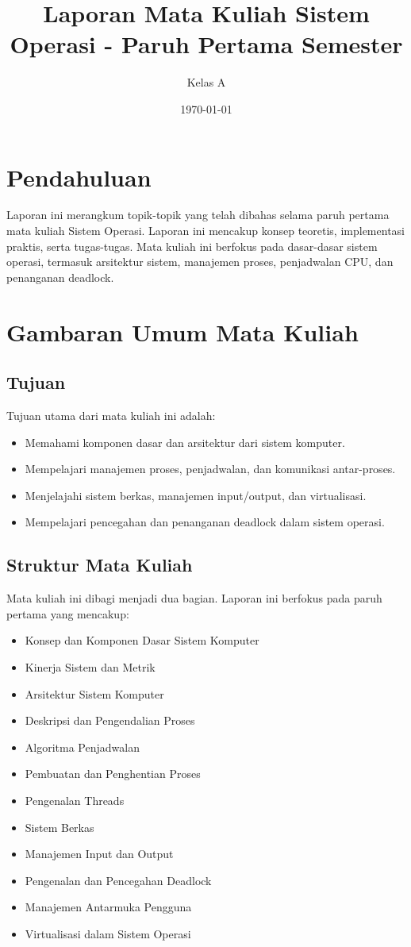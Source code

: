 \documentclass{article}
\title{Laporan Mata Kuliah Sistem Operasi - Paruh Pertama Semester}
\author{Kelas A}
\date{\today}
\begin{document}
\maketitle

\section{Pendahuluan}
Laporan ini merangkum topik-topik yang telah dibahas selama paruh pertama mata kuliah Sistem Operasi. Laporan ini mencakup konsep teoretis, implementasi praktis, serta tugas-tugas. Mata kuliah ini berfokus pada dasar-dasar sistem operasi, termasuk arsitektur sistem, manajemen proses, penjadwalan CPU, dan penanganan deadlock.

\section{Gambaran Umum Mata Kuliah}
\subsection{Tujuan}
Tujuan utama dari mata kuliah ini adalah:
\begin{itemize}
    \item Memahami komponen dasar dan arsitektur dari sistem komputer.
    \item Mempelajari manajemen proses, penjadwalan, dan komunikasi antar-proses.
    \item Menjelajahi sistem berkas, manajemen input/output, dan virtualisasi.
    \item Mempelajari pencegahan dan penanganan deadlock dalam sistem operasi.
\end{itemize}

\subsection{Struktur Mata Kuliah}
Mata kuliah ini dibagi menjadi dua bagian. Laporan ini berfokus pada paruh pertama yang mencakup:
\begin{itemize}
    \item Konsep dan Komponen Dasar Sistem Komputer
    \item Kinerja Sistem dan Metrik
    \item Arsitektur Sistem Komputer
    \item Deskripsi dan Pengendalian Proses
    \item Algoritma Penjadwalan
    \item Pembuatan dan Penghentian Proses
    \item Pengenalan Threads
    \item Sistem Berkas
    \item Manajemen Input dan Output
    \item Pengenalan dan Pencegahan Deadlock
    \item Manajemen Antarmuka Pengguna
    \item Virtualisasi dalam Sistem Operasi
\end{itemize}
\end{document}
